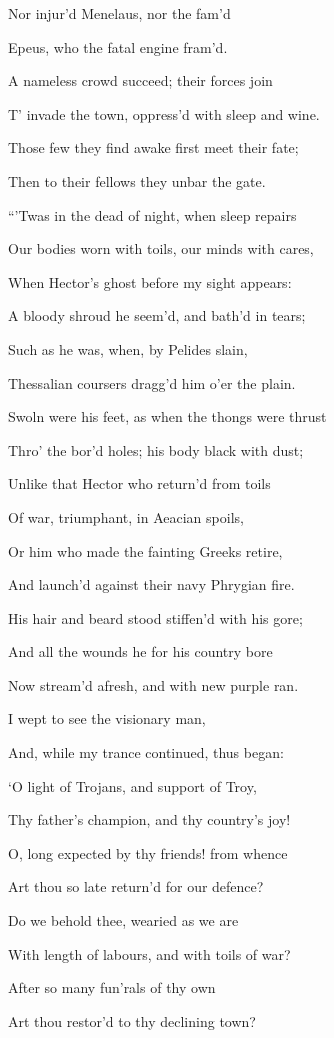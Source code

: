 Nor injur’d Menelaus, nor the fam’d

Epeus, who the fatal engine fram’d.

A nameless crowd succeed; their forces join

T’ invade the town, oppress’d with sleep and wine.

Those few they find awake first meet their fate;

Then to their fellows they unbar the gate.

“’Twas in the dead of night, when sleep repairs

Our bodies worn with toils, our minds with cares,

When Hector’s ghost before my sight appears:

A bloody shroud he seem’d, and bath’d in tears;

Such as he was, when, by Pelides slain,

Thessalian coursers dragg’d him o’er the plain.

Swoln were his feet, as when the thongs were thrust

Thro’ the bor’d holes; his body black with dust;

Unlike that Hector who return’d from toils

Of war, triumphant, in Aeacian spoils,

Or him who made the fainting Greeks retire,

And launch’d against their navy Phrygian fire.

His hair and beard stood stiffen’d with his gore;

And all the wounds he for his country bore

Now stream’d afresh, and with new purple ran.

I wept to see the visionary man,

And, while my trance continued, thus began:

‘O light of Trojans, and support of Troy,

Thy father’s champion, and thy country’s joy!

O, long expected by thy friends! from whence

Art thou so late return’d for our defence?

Do we behold thee, wearied as we are

With length of labours, and with toils of war?

After so many fun’rals of thy own

Art thou restor’d to thy declining town?

